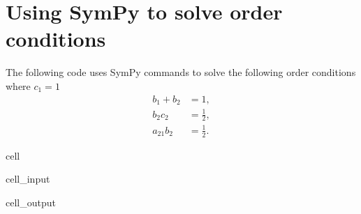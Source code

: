 \documentclass[letterpaper,10pt,english]{jupyterBook}
\begin{document}
\section{Using SymPy to solve order conditions}
\label{\detokenize{8_Appendices/8.1_Python:using-sympy-to-solve-order-conditions}}
\sphinxAtStartPar
The following code uses SymPy commands to solve the following order conditions where \(c_1 = 1\)
\begin{align*}
    b_1 + b_2 &= 1, \\
    b_2c_2 &= \frac{1}{2}, \\
    a_{21} b_2 &= \frac{1}{2}.
\end{align*}
\begin{sphinxuseclass}{cell}\begin{sphinxVerbatimInput}

\begin{sphinxuseclass}{cell_input}
\begin{sphinxVerbatim}[commandchars=\\\{\}]
   

     
  

      
      
      

  
\end{sphinxVerbatim}

\end{sphinxuseclass}\end{sphinxVerbatimInput}
\begin{sphinxVerbatimOutput}

\begin{sphinxuseclass}{cell_output}
\noindent{}

\end{sphinxuseclass}\end{sphinxVerbatimOutput}

\end{sphinxuseclass}
\end{document}
